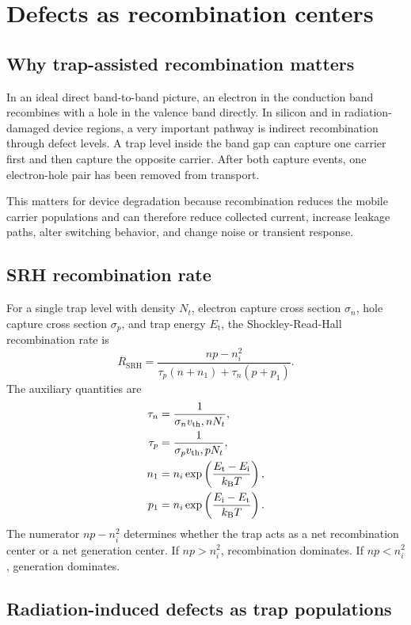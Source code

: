 \documentclass[11pt]{article}
\newcommand{\Rsrh}{R_{\mathrm{SRH}}}
\newcommand{\Ei}{E_{\mathrm{i}}}
\newcommand{\Et}{E_{\mathrm{t}}}
\newcommand{\vt}{v_{\mathrm{th}}}
\begin{document}
\section{Defects as recombination centers}

\subsection{Why trap-assisted recombination matters}

In an ideal direct band-to-band picture, an electron in the conduction band recombines with a hole in the valence band directly. In silicon and in radiation-damaged device regions, a very important pathway is indirect recombination through defect levels. A trap level inside the band gap can capture one carrier first and then capture the opposite carrier. After both capture events, one electron-hole pair has been removed from transport.

This matters for device degradation because recombination reduces the mobile carrier populations and can therefore reduce collected current, increase leakage paths, alter switching behavior, and change noise or transient response.

\subsection{SRH recombination rate}

For a single trap level with density \(N_t\), electron capture cross section \(\sigma_n\), hole capture cross section \(\sigma_p\), and trap energy \(\Et\), the Shockley-Read-Hall recombination rate is
\begin{equation}
\boxed{
\Rsrh=\frac{np-n_i^2}{\tau_p(n+n_1)+\tau_n(p+p_1)}.
}
\end{equation}
The auxiliary quantities are
\begin{align}
\tau_n&=\frac{1}{\sigma_n \vt,n N_t}, \\
\tau_p&=\frac{1}{\sigma_p \vt,p N_t}, \\
n_1&=n_i\exp\left(\frac{\Et-\Ei}{\kB T}\right), \\
p_1&=n_i\exp\left(\frac{\Ei-\Et}{\kB T}\right).
\end{align}
The numerator \(np-n_i^2\) determines whether the trap acts as a net recombination center or a net generation center. If \(np>n_i^2\), recombination dominates. If \(np<n_i^2\), generation dominates.

\subsection{Radiation-induced defects as trap populations}
\end{document}
